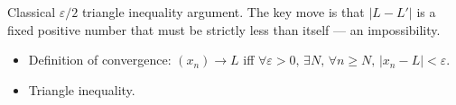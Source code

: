 \begin{remark*}
Classical $\varepsilon/2$ triangle inequality argument. The key move is
that $|L - L'|$ is a fixed positive number that must be strictly less
than itself — an impossibility.
\end{remark*}

\begin{remark*}[Dependencies]
\begin{itemize}
  \item Definition of convergence: $(x_n) \to L$ iff
        $\forall \varepsilon > 0,\, \exists N,\, \forall n \ge N,\, |x_n - L| < \varepsilon$.
  \item Triangle inequality.
\end{itemize}
\end{remark*}
